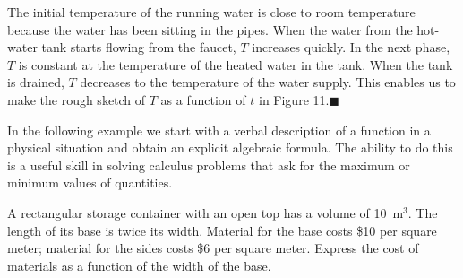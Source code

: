 \documentclass{sebase}
\begin{document}
\begin{Solution}
The initial temperature of
the running water is close to room temperature because the water has been
sitting in the pipes. When the water from the hot-water tank starts flowing
from the faucet, $T$ increases quickly. In the next phase, $T$ is constant
at the temperature of the heated water in the tank. When the tank is
drained, $T$ decreases to the temperature of the water supply. This enables
us to make the rough sketch of $T$ as a function of $t$ in Figure 11.\vspace{%
-12pt}$\blacksquare $
\end{Solution}

In the following example we start with a verbal description of a function in
a physical situation and obtain an explicit algebraic formula. The ability
to do this is a useful skill in solving calculus problems that ask for the
maximum or minimum values of quantities.\vspace{-6pt}

\begin{Example}[5]
\VIDEO%
%
A rectangular storage container with an open top has a volume of 10~m$^{3}$.
The length of its base is twice its width. Material for the base costs \$10
per square meter; material for the sides costs \$6 per square meter. Express
the cost of materials as a function of the width of the base.
\end{Example}
\end{document}
